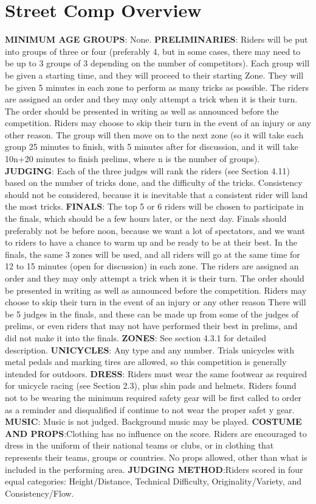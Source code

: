 \section{Street Comp Overview}

\textbf{MINIMUM AGE GROUPS}: None.
\textbf{PRELIMINARIES}: Riders will be put into groups of three or four (preferably 4, but in some cases, there may need to be up to 3 groups of 3 depending on the number of competitors). Each group will be given a starting time, and they will proceed to their starting Zone. They will be given 5 minutes in each zone to perform as many tricks as possible. The riders are assigned an order and they may only attempt a trick when it is their turn. The order should be presented in writing as well as announced before the competition. Riders may choose to skip their turn in the event of an injury or any other reason. The group will then move on to the next zone (so it will take each group 25 minutes to finish, with 5 minutes after for discussion, and it will take 10n+20 minutes to finish prelims, where n is the number of groups). 
\textbf{JUDGING}: Each of the three judges will rank the riders (see Section 4.11) based on the number of tricks done, and the difficulty of the tricks. Consistency should not be considered, because it is inevitable that a consistent rider will land the most tricks.
\textbf{FINALS}: The top 5 or 6 riders will be chosen to participate in the finals, which should be a few hours later, or the next day. Finals should preferably not be before noon, because we want a lot of spectators, and we want to riders to have a chance to warm up and be ready to be at their best. In the finals, the same 3 zones will be used, and all riders will go at the same time for 12 to 15 minutes (open for discussion) in each zone. The riders are assigned an order and they may only attempt a trick when it is their turn. The order should be presented in writing as well as announced before the competition. Riders may choose to skip their turn in the event of an injury or any other reason There will be 5 judges in the finals, and these can be made up from some of the judges of prelims, or even riders that may not have performed their best in prelims, and did not make it into the finals.
\textbf{ZONES}: See section 4.3.1 for detailed description.
\textbf{UNICYCLES}: Any type and any number. Trials unicycles with metal pedals and marking tires are allowed, so this competition is generally intended for outdoors. 
\textbf{DRESS}: Riders must wear the same footwear as required for unicycle racing (see Section 2.3), plus shin pads and helmets.
Riders found not to be wearing the minimum required safety gear will be first called to order as a reminder and
disqualified if continue to not wear the proper safet
y gear.
\textbf{MUSIC}: Music is not judged. Background music may be played.
\textbf{COSTUME AND PROPS}:Clothing has no influence on the score. Riders are encouraged to dress in the uniform of their national teams or clubs, or in clothing that represents their teams, groups or countries. No props allowed, other than what is included in the performing area.
\textbf{JUDGING METHOD}:Riders scored in four equal categories: Height/Distance, Technical Difficulty, Originality/Variety, and Consistency/Flow.
